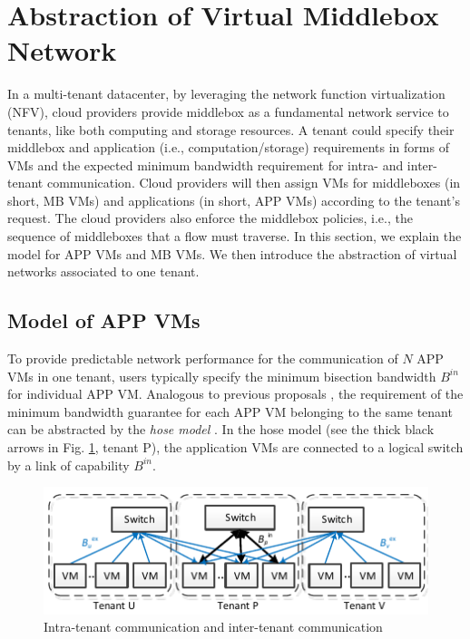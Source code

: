 \documentclass[review]{elsarticle}
\begin{document}
\section{Abstraction of Virtual Middlebox Network}\label{sec:abstraction}
In a multi-tenant datacenter, by leveraging the network function virtualization (NFV), cloud providers provide middlebox as a fundamental network service to tenants, like both computing and storage resources. A tenant could specify their middlebox and application (i.e., computation/storage) requirements in forms of VMs and the expected minimum bandwidth requirement for intra- and inter-tenant communication. Cloud providers will then assign VMs for middleboxes (in short, MB VMs) and applications (in short, APP VMs) according to the tenant's request. The cloud providers also enforce the middlebox policies, i.e., the sequence of middleboxes that a flow must traverse. In this section, we explain the model for APP VMs and MB VMs. We then introduce the abstraction of virtual networks associated to one tenant.


\subsection{Model of APP VMs}
To provide predictable network performance for the communication of $N$ APP VMs in one tenant, users typically specify the minimum bisection bandwidth $B^{in}$ for individual APP VM. Analogous to previous proposals \cite{B13cta, P12fst}, the requirement of the minimum bandwidth guarantee for each APP VM belonging to the same tenant can be abstracted by the \emph{hose model} \cite{hose_model}. In the hose model (see the thick black arrows in Fig. \ref{fig:hose}, tenant P), the application VMs are connected to a logical switch by a link of capability $B^{in}$.

\begin{figure}
	\centering
		\includegraphics[width=4.5 in]{fig/tagmodel.pdf}
	\caption{Intra-tenant communication and inter-tenant communication}
	\label{fig:hose}
\end{figure}
\end{document}

